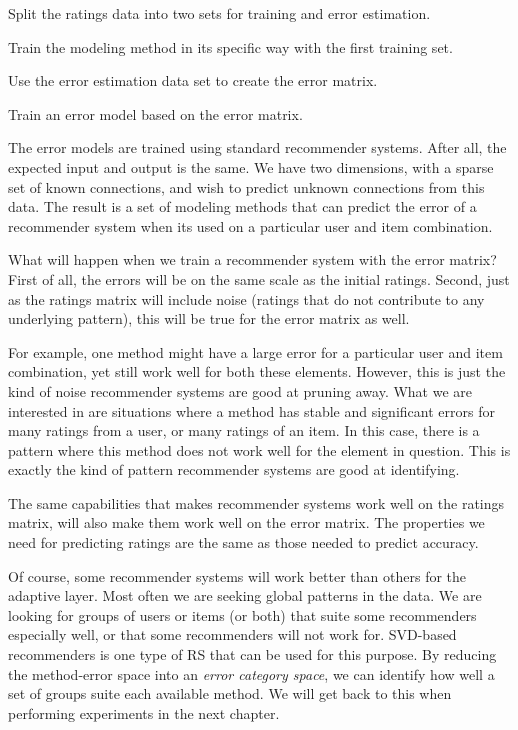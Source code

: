 \begin{enumerate*}
  \item Split the ratings data into two sets for training and error estimation.
  \item Train the modeling method in its specific way with the first training set.
  \item Use the error estimation data set to create the error matrix.
  \item Train an error model based on the error matrix.
\end{enumerate*}

The error models are trained using standard recommender systems.
After all, the expected input and output is the same.
We have two dimensions, with a sparse set of known connections,
and wish to predict unknown connections from this data.
The result is a set of modeling methods
that can predict the error of a recommender system
when its used on a particular user and item combination.

What will happen when we train a recommender system with the error matrix?
First of all, the errors will be on the same scale as the initial ratings.
Second, just as the ratings matrix will include noise (ratings that
do not contribute to any underlying pattern), this will be 
true for the error matrix as well.

For example, one method might have a large error for a particular user and item combination,
yet still work well for both these elements. 
However, this is just the kind of noise recommender systems are good at pruning away.
What we are interested in are situations where a method
has stable and significant errors for many ratings from a user,
or many ratings of an item.
In this case, there is a pattern where this method does not 
work well for the element in question.
This is exactly the kind of pattern recommender systems are good at identifying.

The same capabilities that makes recommender systems work well
on the ratings matrix, will also make them work well on the error matrix.
The properties we need for predicting ratings
are the same as those needed to predict accuracy.

Of course, some recommender systems will work better than others for the adaptive layer.
Most often we are seeking global patterns in the data.
We are looking for groups of users or items (or both) that suite some 
recommenders especially well, or that some recommenders will not work for.
SVD-based recommenders is one type of RS that can be used for this purpose.
By reducing the method-error space into an \emph{error category space},
we can identify how well a set of groups suite each available method.
We will get back to this when performing experiments in the next chapter.

